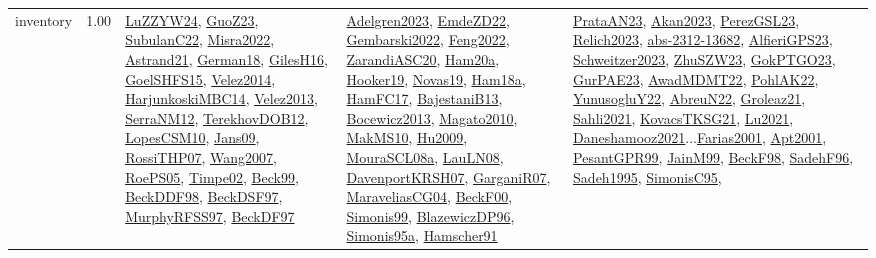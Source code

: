 {\begin{longtable}{p{3cm}r>{\raggedright\arraybackslash}p{6cm}>{\raggedright\arraybackslash}p{6cm}>{\raggedright\arraybackslash}p{8cm}}
\index{inventory}\index{Concepts!inventory}inventory &  1.00 & \hyperref[detail:LuZZYW24]{LuZZYW24}, \hyperref[detail:GuoZ23]{GuoZ23}, \hyperref[detail:SubulanC22]{SubulanC22}, \hyperref[detail:Misra2022]{Misra2022}, \hyperref[detail:Astrand21]{Astrand21}, \hyperref[detail:German18]{German18}, \hyperref[detail:GilesH16]{GilesH16}, \hyperref[detail:GoelSHFS15]{GoelSHFS15}, \hyperref[detail:Velez2014]{Velez2014}, \hyperref[detail:HarjunkoskiMBC14]{HarjunkoskiMBC14}, \hyperref[detail:Velez2013]{Velez2013}, \hyperref[detail:SerraNM12]{SerraNM12}, \hyperref[detail:TerekhovDOB12]{TerekhovDOB12}, \hyperref[detail:LopesCSM10]{LopesCSM10}, \hyperref[detail:Jans09]{Jans09}, \hyperref[detail:RossiTHP07]{RossiTHP07}, \hyperref[detail:Wang2007]{Wang2007}, \hyperref[detail:RoePS05]{RoePS05}, \hyperref[detail:Timpe02]{Timpe02}, \hyperref[detail:Beck99]{Beck99}, \hyperref[detail:BeckDDF98]{BeckDDF98}, \hyperref[detail:BeckDSF97]{BeckDSF97}, \hyperref[detail:MurphyRFSS97]{MurphyRFSS97}, \hyperref[detail:BeckDF97]{BeckDF97} & \hyperref[detail:Adelgren2023]{Adelgren2023}, \hyperref[detail:EmdeZD22]{EmdeZD22}, \hyperref[detail:Gembarski2022]{Gembarski2022}, \hyperref[detail:Feng2022]{Feng2022}, \hyperref[detail:ZarandiASC20]{ZarandiASC20}, \hyperref[detail:Ham20a]{Ham20a}, \hyperref[detail:Hooker19]{Hooker19}, \hyperref[detail:Novas19]{Novas19}, \hyperref[detail:Ham18a]{Ham18a}, \hyperref[detail:HamFC17]{HamFC17}, \hyperref[detail:BajestaniB13]{BajestaniB13}, \hyperref[detail:Bocewicz2013]{Bocewicz2013}, \hyperref[detail:Magato2010]{Magato2010}, \hyperref[detail:MakMS10]{MakMS10}, \hyperref[detail:Hu2009]{Hu2009}, \hyperref[detail:MouraSCL08a]{MouraSCL08a}, \hyperref[detail:LauLN08]{LauLN08}, \hyperref[detail:DavenportKRSH07]{DavenportKRSH07}, \hyperref[detail:GarganiR07]{GarganiR07}, \hyperref[detail:MaraveliasCG04]{MaraveliasCG04}, \hyperref[detail:BeckF00]{BeckF00}, \hyperref[detail:Simonis99]{Simonis99}, \hyperref[detail:BlazewiczDP96]{BlazewiczDP96}, \hyperref[detail:Simonis95a]{Simonis95a}, \hyperref[detail:Hamscher91]{Hamscher91} & \hyperref[detail:PrataAN23]{PrataAN23}, \hyperref[detail:Akan2023]{Akan2023}, \hyperref[detail:PerezGSL23]{PerezGSL23}, \hyperref[detail:Relich2023]{Relich2023}, \hyperref[detail:abs-2312-13682]{abs-2312-13682}, \hyperref[detail:AlfieriGPS23]{AlfieriGPS23}, \hyperref[detail:Schweitzer2023]{Schweitzer2023}, \hyperref[detail:ZhuSZW23]{ZhuSZW23}, \hyperref[detail:GokPTGO23]{GokPTGO23}, \hyperref[detail:GurPAE23]{GurPAE23}, \hyperref[detail:AwadMDMT22]{AwadMDMT22}, \hyperref[detail:PohlAK22]{PohlAK22}, \hyperref[detail:YunusogluY22]{YunusogluY22}, \hyperref[detail:AbreuN22]{AbreuN22}, \hyperref[detail:Groleaz21]{Groleaz21}, \hyperref[detail:Sahli2021]{Sahli2021}, \hyperref[detail:KovacsTKSG21]{KovacsTKSG21}, \hyperref[detail:Lu2021]{Lu2021}, \hyperref[detail:Daneshamooz2021]{Daneshamooz2021}...\hyperref[detail:Farias2001]{Farias2001}, \hyperref[detail:Apt2001]{Apt2001}, \hyperref[detail:PesantGPR99]{PesantGPR99}, \hyperref[detail:JainM99]{JainM99}, \hyperref[detail:BeckF98]{BeckF98}, \hyperref[detail:SadehF96]{SadehF96}, \hyperref[detail:Sadeh1995]{Sadeh1995}, \hyperref[detail:SimonisC95]{SimonisC95}, 
\end{longtable}}
